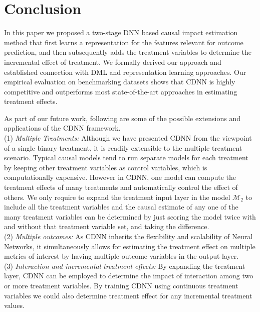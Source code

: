 \documentclass[sigconf]{acmart}
\theoremstyle{plain}
\numberwithin{equation}{section}
\begin{document}
\section{Conclusion}
\label{sec:conclusion}
In this paper we proposed a two-stage DNN based causal impact estimation method that first learns a representation for the features relevant for outcome prediction, and then subsequently adds the treatment variables to determine the incremental effect of treatment. We formally derived our approach and established connection with DML and representation learning approaches. Our empirical evaluation on benchmarking datasets shows that CDNN is highly competitive and outperforms most state-of-the-art approaches in estimating treatment effects.

As part of our future work, following are some of the possible extensions and applications of the CDNN framework.\\ (1) \emph{Multiple Treatments:} Although we have presented CDNN from the viewpoint of a single binary treatment, it is readily extensible to the multiple treatment scenario. Typical causal models tend to run separate models for each treatment by keeping other treatment variables as control variables, which is computationally expensive. However in CDNN, one model can compute the treatment effects of many treatments and automatically control the effect of others. We only require to expand the treatment input layer in the model $\mathcal{M}_2$ to include all the treatment variables and the causal estimate of any one of the many treatment variables can be determined by just scoring the model twice with and without that treatment variable set, and taking the difference.\\ (2) \emph{Multiple outcomes:} As CDNN inherits the flexibility and scalability of Neural Networks, it simultaneously allows for estimating the treatment effect on multiple metrics of interest by having multiple outcome variables in the output layer.\\ (3) \emph{Interaction and incremental treatment effects:} By expanding the treatment layer, CDNN can be employed to determine the impact of interaction among two or more treatment variables. By training CDNN using continuous treatment variables we could also determine treatment effect for any incremental treatment values.
\end{document}
